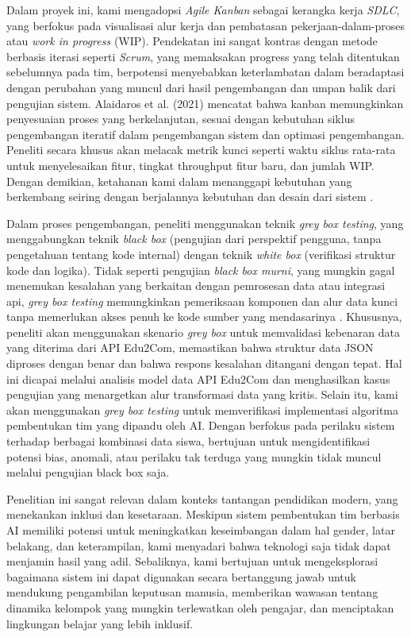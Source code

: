 Dalam proyek ini, kami mengadopsi \textit{Agile Kanban} sebagai kerangka kerja
\textit{SDLC}, yang berfokus pada visualisasi alur kerja dan pembatasan
pekerjaan-dalam-proses atau \textit{work in progress} (WIP). Pendekatan ini
sangat kontras dengan metode berbasis iterasi seperti \textit{Scrum}, yang
memaksakan progress yang telah ditentukan sebelumnya pada tim, berpotensi
menyebabkan keterlambatan dalam beradaptasi dengan perubahan yang muncul dari
hasil pengembangan dan umpan balik dari pengujian sistem. Alaidaros et al. (2021) mencatat bahwa kanban memungkinkan penyesuaian proses yang berkelanjutan, sesuai dengan kebutuhan siklus pengembangan iteratif dalam pengembangan sistem dan optimasi pengembangan. Peneliti secara khusus akan melacak metrik kunci seperti waktu siklus rata-rata untuk menyelesaikan fitur, tingkat throughput fitur baru, dan jumlah WIP. Dengan demikian, ketahanan kami dalam menanggapi kebutuhan yang berkembang seiring dengan berjalannya kebutuhan dan desain dari sistem \cite{Alaidaros2021}.


Dalam proses pengembangan, peneliti menggunakan teknik \textit{grey box
	testing}, yang menggabungkan teknik \textit{black box} (pengujian dari
perspektif pengguna, tanpa pengetahuan tentang kode internal) dengan teknik
\textit{white box} (verifikasi struktur kode dan logika). Tidak seperti
pengujian \textit{black box murni}, yang mungkin gagal menemukan kesalahan yang
berkaitan dengan pemrosesan data atau integrasi api, \textit{grey box testing}
memungkinkan pemeriksaan komponen dan alur data kunci tanpa memerlukan akses
penuh ke kode sumber yang mendasarinya \cite{Khan2012}. Khususnya, peneliti
akan menggunakan skenario \textit{grey box} untuk memvalidasi kebenaran data
yang diterima dari API Edu2Com, memastikan bahwa struktur data JSON diproses
dengan benar dan bahwa respons kesalahan ditangani dengan tepat. Hal ini
dicapai melalui analisis model data API Edu2Com dan menghasilkan kasus
pengujian yang menargetkan alur transformasi data yang kritis. Selain itu, kami
akan menggunakan \textit{grey box testing} untuk memverifikasi implementasi
algoritma pembentukan tim yang dipandu oleh AI. Dengan berfokus pada perilaku
sistem terhadap berbagai kombinasi data siswa, bertujuan untuk mengidentifikasi
potensi bias, anomali, atau perilaku tak terduga yang mungkin tidak muncul
melalui pengujian black box saja.

Penelitian ini sangat relevan dalam konteks tantangan pendidikan modern, yang
menekankan inklusi dan kesetaraan. Meskipun sistem pembentukan tim berbasis AI
memiliki potensi untuk meningkatkan keseimbangan dalam hal gender, latar
belakang, dan keterampilan, kami menyadari bahwa teknologi saja tidak dapat
menjamin hasil yang adil. Sebaliknya, kami bertujuan untuk mengeksplorasi
bagaimana sistem ini dapat digunakan secara bertanggung jawab untuk mendukung
pengambilan keputusan manusia, memberikan wawasan tentang dinamika kelompok
yang mungkin terlewatkan oleh pengajar, dan menciptakan lingkungan belajar yang
lebih inklusif.

